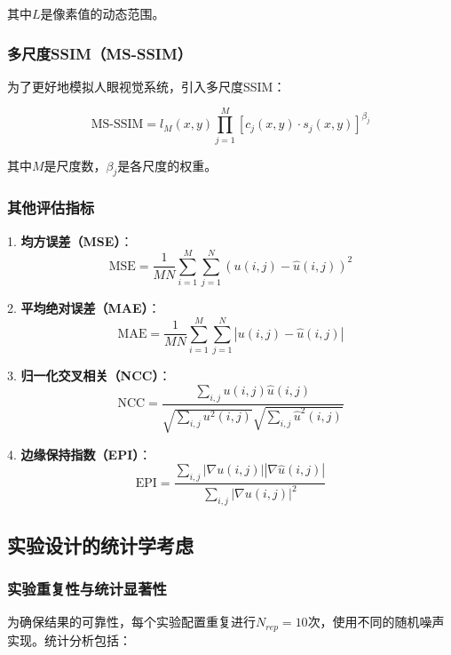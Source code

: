 \documentclass[a4paper,12pt]{ctexart}
\begin{document}
其中$L$是像素值的动态范围。

\subsubsection{多尺度SSIM（MS-SSIM）}

为了更好地模拟人眼视觉系统，引入多尺度SSIM：

\begin{equation}
\text{MS-SSIM} = l_M(x,y) \prod_{j=1}^{M} [c_j(x,y) \cdot s_j(x,y)]^{\beta_j}
\end{equation}

其中$M$是尺度数，$\beta_j$是各尺度的权重。

\subsubsection{其他评估指标}

1. \textbf{均方误差（MSE）}：
\begin{equation}
\text{MSE} = \frac{1}{MN} \sum_{i=1}^{M} \sum_{j=1}^{N} (u(i,j) - \hat{u}(i,j))^2
\end{equation}

2. \textbf{平均绝对误差（MAE）}：
\begin{equation}
\text{MAE} = \frac{1}{MN} \sum_{i=1}^{M} \sum_{j=1}^{N} |u(i,j) - \hat{u}(i,j)|
\end{equation}

3. \textbf{归一化交叉相关（NCC）}：
\begin{equation}
\text{NCC} = \frac{\sum_{i,j} u(i,j) \hat{u}(i,j)}{\sqrt{\sum_{i,j} u^2(i,j)} \sqrt{\sum_{i,j} \hat{u}^2(i,j)}}
\end{equation}

4. \textbf{边缘保持指数（EPI）}：
\begin{equation}
\text{EPI} = \frac{\sum_{i,j} |\nabla u(i,j)| |\nabla \hat{u}(i,j)|}{\sum_{i,j} |\nabla u(i,j)|^2}
\end{equation}

\subsection{实验设计的统计学考虑}

\subsubsection{实验重复性与统计显著性}

为确保结果的可靠性，每个实验配置重复进行$N_{rep} = 10$次，使用不同的随机噪声实现。统计分析包括：
\end{document}
